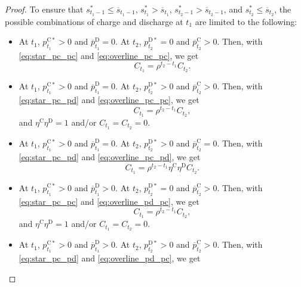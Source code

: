 \documentclass[10pt,a4paper]{amsart}
\newcommand{\up}[1]{^{\mathrm{#1}}}
\begin{document}
\begin{proof}
    To ensure that $s_{t_1-1}^* \leq \overline{s}_{t_1-1}$, $s_{t_1}^* > \overline{s}_{t_1}$, $s_{t_2-1}^* > \overline{s}_{t_2-1}$, and $s_{t_2}^* \leq \overline{s}_{t_2}$, the possible combinations of charge and discharge at $t_1$ are limited to the following:
    
    \begin{itemize}
        \item At $t_1$, $p_{t_1}\up{C*}>0$ and $\overline{p}_{t_1}\up{D}=0$. At $t_2$, $p_{t_2}\up{D*}=0$ and $\overline{p}_{t_2}\up{C}>0$.
        Then, with \eqref{eq:star_pc_pc} and \eqref{eq:overline_pc_pc}, we get
        \begin{equation} \label{eq:pc_pc_pc_pc}
            C_{t_1} = \rho^{t_2 - t_1} C_{t_2}.
        \end{equation}
        \item At $t_1$, $p_{t_1}\up{C*}>0$ and $\overline{p}_{t_1}\up{D}=0$. At $t_2$, $p_{t_2}\up{D*}>0$ and $\overline{p}_{t_2}\up{C}>0$.
        Then, with \eqref{eq:star_pc_pd} and \eqref{eq:overline_pc_pc}, we get
        \begin{equation} \label{eq:pc_pd_pc_pc}
            C_{t_1} = \rho^{t_2 - t_1} C_{t_2},
        \end{equation}
        and $\eta\up{C} \eta\up{D} = 1$ and/or $C_{t_1} = C_{t_2} = 0$.
        \item At $t_1$, $p_{t_1}\up{C*}>0$ and $\overline{p}_{t_1}\up{D}=0$. At $t_2$, $p_{t_2}\up{D*}>0$ and $\overline{p}_{t_2}\up{C}=0$.
        Then, with \eqref{eq:star_pc_pd} and \eqref{eq:overline_pc_pd}, we get
        \begin{equation} \label{eq:pc_pd_pc_pd}
            C_{t_1} = \rho^{t_2 - t_1} \eta\up{C} \eta\up{D} C_{t_2}.
        \end{equation}
        \item At $t_1$, $p_{t_1}\up{C*}>0$ and $\overline{p}_{t_1}\up{D}>0$. At $t_2$, $p_{t_2}\up{D*}=0$ and $\overline{p}_{t_2}\up{C}>0$.
        Then, with \eqref{eq:star_pc_pc} and \eqref{eq:overline_pd_pc}, we get
        \begin{equation} \label{eq:pc_pc_pd_pc}
            C_{t_1} = \rho^{t_2 - t_1} C_{t_2},
        \end{equation}
        and $\eta\up{C} \eta\up{D} = 1$ and/or $C_{t_1} = C_{t_2} = 0$.
        \item At $t_1$, $p_{t_1}\up{C*}>0$ and $\overline{p}_{t_1}\up{D}>0$. At $t_2$, $p_{t_2}\up{D*}>0$ and $\overline{p}_{t_2}\up{C}>0$.
        Then, with \eqref{eq:star_pc_pd} and \eqref{eq:overline_pd_pc}, we get

\end{itemize}
\end{proof}
\end{document}
